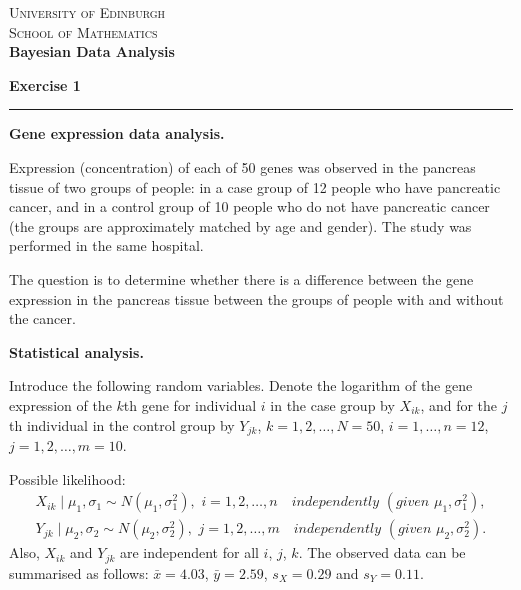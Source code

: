 \documentclass[12pt]{report}
\begin{document}
\def \bbeta{\mbox {\boldmath $\beta$}}
\def \btheta{\mbox {\boldmath $\theta$}}
\def \bmu{\mbox {\boldmath $\mu$}}
\def \ttheta{{\theta}}
\def \tmu{{\mu}}
\def \tbu{{\bf U}}
\def \tby{{\bf Y}}
\def \tbz{{\bf Z}}
\def \ta{{A}}
\def \tb{{B}}
\def \tn{{N}}
\def \tr{{R}}
\def \ts{{S}}
\def \tt{{T}}
\def \tu{{U}}
\def \tx{{X}}
\def \ty{{Y}}
\def \tz{{Z}}
\def \bb{\bf b}
\def \bm{\bf m}
\def \bn{\bf n}
\def \by{\bf y}
\def \bz{\bf z}
\def \bX{\bf X}

\begin{center}
\vspace*{-.5cm}\textsc{University of Edinburgh}\\
\textsc{School of Mathematics}\\
\vspace{.25cm} \textbf{\large Bayesian Data Analysis}
\end{center}

\textbf{ Exercise 1}
\vspace{.35cm}
\hrule
\vspace{1cm}

\begin{center}
{\bf Gene expression data analysis.}
\end{center}

\vspace{1cm}

Expression (concentration) of each of 50 genes was observed in the pancreas tissue of two groups of people: in a case group of 12 people who have pancreatic cancer, and in a control group of 10 people who do not have pancreatic cancer (the groups are approximately matched by age and gender). The study was performed in the same hospital.

The question is to determine whether there is a difference between the gene expression in the pancreas tissue between the groups of people with and without the cancer.

{\bf Statistical analysis.}

Introduce the following random variables. Denote the logarithm of the gene expression of the $k$th gene for individual $i$ in the case group by $X_{ik}$, and for the $j$th individual in the control group by $Y_{jk}$, $k=1,2,\ldots, N = 50$, $i=1,\ldots, n=12$, $j=1,2,\ldots, m = 10$.

Possible likelihood:
\begin{eqnarray*}
X_{ik} \mid \mu_1, \sigma_1 \sim N(\mu_1, \sigma_1^2), \,\,i=1,2,\ldots, n  \quad  independently\,\, (given \,\,   \mu_1, \sigma_1^2),\\
Y_{jk} \mid \mu_2, \sigma_2 \sim N(\mu_2, \sigma_2^2), \,\, j=1,2,\ldots, m  \quad  independently\,\, (given  \,\,  \mu_2, \sigma_2^2).
\end{eqnarray*}
Also, $X_{ik}$ and $Y_{jk}$ are independent for all $i$, $j$, $k$. The observed data can be summarised as follows: $\bar{x} = 4.03$, $\bar{y} = 2.59$, $s_X = 0.29$ and $s_Y = 0.11$. 
\end{document}
